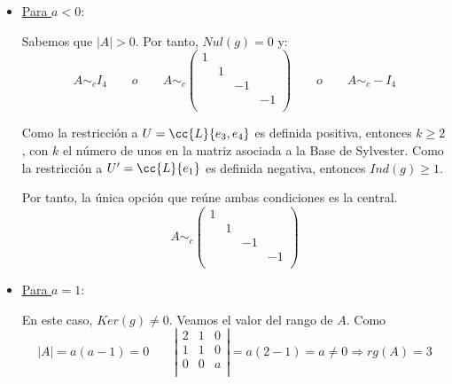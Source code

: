 \begin{ejercicio}
\begin{itemize}
        \item \underline{Para $a<0$}:
        
        Sabemos que $|A|>0$. Por tanto, $Nul(g)=0$ y:
        \begin{equation*}
            A\sim_c I_4
            \qquad o \qquad
            A\sim_c\left(\begin{array}{cccc}
                 1&&&  \\
                 &1&& \\
                 &&-1& \\
                 &&&-1 \\
            \end{array}\right)
            \qquad o \qquad
            A\sim_c -I_4
        \end{equation*}
    
        Como la restricción a $U=\cc{L}\{e_3,e_4\}$ es definida positiva, entonces $k\geq 2$, con $k$ el número de unos en la matriz asociada a la Base de Sylvester.
        Como la restricción a $U'=\cc{L}\{e_1\}$ es definida negativa, entonces $Ind(g)\geq 1$.
        
        Por tanto, la única opción que reúne ambas condiciones es la central.
        \begin{equation*}
            A\sim_c\left(\begin{array}{cccc}
                 1&&&  \\
                 &1&& \\
                 &&-1& \\
                 &&&-1 \\
            \end{array}\right)
        \end{equation*}

        \item \underline{Para $a=1$}:
        
        En este caso, $Ker(g)\neq 0$. Veamos el valor del rango de $A$. Como
        \begin{equation*}
            |A|=a(a-1) = 0
            \qquad
            \left|\begin{array}{ccc}
                2 & 1 & 0 \\
                1 & 1 & 0 \\
                0 & 0 & a \\
            \end{array} \right|=a(2-1)=a \neq 0\Longrightarrow rg(A)=3
        \end{equation*}
    

\end{itemize}
\end{ejercicio}

